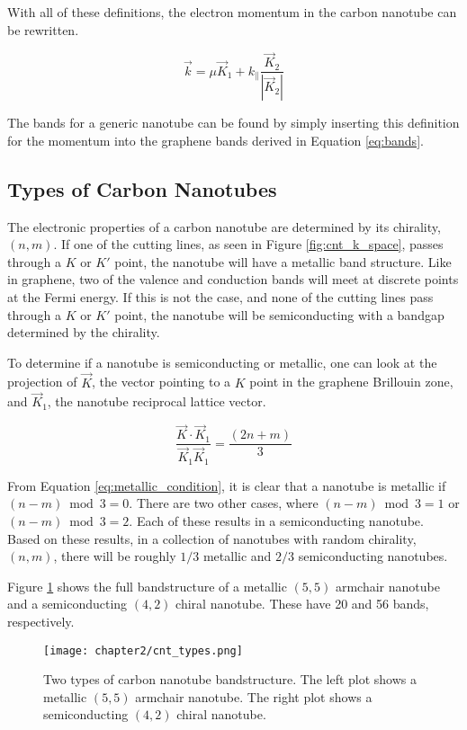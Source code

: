 With all of these definitions, the electron momentum in the carbon nanotube can be rewritten.

\begin{equation}
    \vec{k} = \mu\vec{K}_1 + k_{\parallel}\frac{\vec{K}_2}{|\vec{K}_2|}
    \label{eq:k_quant}
\end{equation}

The bands for a generic nanotube can be found by simply inserting this definition for the momentum into the graphene bands derived in Equation \ref{eq:bands}. 

\subsection{Types of Carbon Nanotubes}

The electronic properties of a carbon nanotube are determined by its chirality, $(n,m)$. If one of the cutting lines, as seen in Figure \ref{fig:cnt_k_space}, passes through a $K$ or $K'$ point, the nanotube will have a metallic band structure. Like in graphene, two of the valence and conduction bands will meet at discrete points at the Fermi energy. If this is not the case, and none of the cutting lines pass through a $K$ or $K'$ point, the nanotube will be semiconducting with a bandgap determined by the chirality.

To determine if a nanotube is semiconducting or metallic, one can look at the projection of $\vec{K}$, the vector pointing to a $K$ point in the graphene Brillouin zone, and $\vec{K}_1$, the nanotube reciprocal lattice vector.

\begin{equation}
    \frac{\vec{K}\cdot\vec{K}_1}{\vec{K}_1\vec{K}_1} = \frac{(2n+m)}{3} 
    \label{eq:metallic_condition}
\end{equation}

From Equation \ref{eq:metallic_condition}, it is clear that a nanotube is metallic if $(n-m)\bmod3 = 0$. There are two other cases, where $(n-m)\bmod3 = 1$ or $(n-m)\bmod3 = 2$. Each of these results in a semiconducting nanotube. Based on these results, in a collection of nanotubes with random chirality, $(n,m)$, there will be roughly $1/3$ metallic and $2/3$ semiconducting nanotubes.

Figure \ref{fig:cnt_types} shows the full bandstructure of a metallic $(5,5)$ armchair nanotube and a semiconducting $(4,2)$ chiral nanotube. These have 20 and 56 bands, respectively.

\begin{figure}
    \centering
    \texttt{[image: chapter2/cnt\_types.png]}
    \caption{Two types of carbon nanotube bandstructure. The left plot shows a metallic $(5,5)$ armchair nanotube. The right plot shows a semiconducting $(4,2)$ chiral nanotube.}
    \label{fig:cnt_types}
\end{figure}


